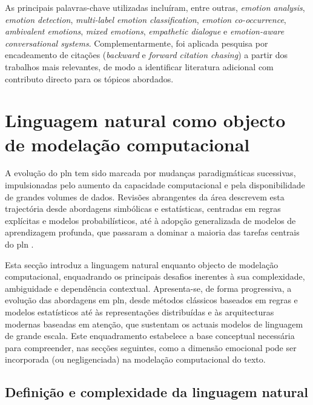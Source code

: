 As principais palavras-chave utilizadas incluíram, entre outras, \textit{emotion analysis}, \textit{emotion detection}, \textit{multi-label emotion classification}, \textit{emotion co-occurrence}, \textit{ambivalent emotions}, \textit{mixed emotions}, \textit{empathetic dialogue} e \textit{emotion-aware conversational systems}. Complementarmente, foi aplicada pesquisa por encadeamento de citações (\textit{backward} e \textit{forward citation chasing}) a partir dos trabalhos mais relevantes, de modo a identificar literatura adicional com contributo directo para os tópicos abordados.


\section{Linguagem natural como objecto de modelação computacional}
\label{sec:linguagem_natural}

A evolução do \gls{pln} tem sido marcada por mudanças paradigmáticas sucessivas, impulsionadas pelo aumento da capacidade computacional e pela disponibilidade de grandes volumes de dados. Revisões abrangentes da área descrevem esta trajectória desde abordagens simbólicas e estatísticas, centradas em regras explícitas e modelos probabilísticos, até à adopção generalizada de modelos de aprendizagem profunda, que passaram a dominar a maioria das tarefas centrais do \gls{pln} \parencite{Young2018Trends}.

Esta secção introduz a linguagem natural enquanto objecto de modelação computacional, enquadrando os principais desafios inerentes à sua complexidade, ambiguidade e dependência contextual. Apresenta-se, de forma progressiva, a evolução das abordagens em \gls{pln}, desde métodos clássicos baseados em regras e modelos estatísticos até às representações distribuídas e às arquitecturas modernas baseadas em atenção, que sustentam os actuais modelos de linguagem de grande escala. Este enquadramento estabelece a base conceptual necessária para compreender, nas secções seguintes, como a dimensão emocional pode ser incorporada (ou negligenciada) na modelação computacional do texto.

\subsection{Definição e complexidade da linguagem natural}
\label{subsec:def_linguagem}

